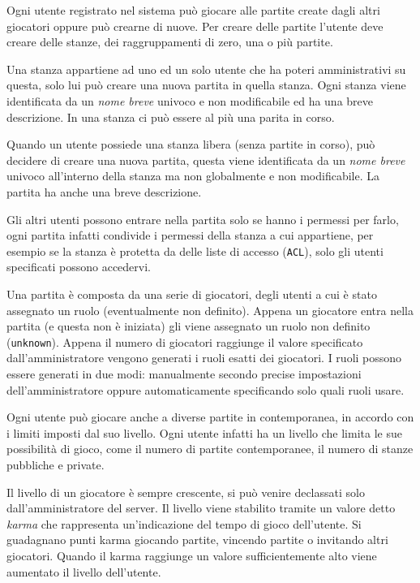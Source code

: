 Ogni utente registrato nel sistema può giocare alle partite create dagli altri giocatori oppure può crearne di nuove. Per creare delle partite l'utente deve creare delle stanze, dei raggruppamenti di zero, una o più partite.

Una stanza appartiene ad uno ed un solo utente che ha poteri amministrativi su questa, solo lui può creare una nuova partita in quella stanza. Ogni stanza viene identificata da un \emph{nome breve} univoco e non modificabile ed ha una breve descrizione. In una stanza ci può essere al più una parita in corso.

Quando un utente possiede una stanza libera (senza partite in corso), può decidere di creare una nuova partita, questa viene identificata da un \emph{nome breve} univoco all'interno della stanza ma non globalmente e non modificabile. La partita ha anche una breve descrizione.

Gli altri utenti possono entrare nella partita solo se hanno i permessi per farlo, ogni partita infatti condivide i permessi della stanza a cui appartiene, per esempio se la stanza è protetta da delle liste di accesso (\texttt{ACL}), solo gli utenti specificati possono accedervi.

Una partita è composta da una serie di giocatori, degli utenti a cui è stato assegnato un ruolo (eventualmente non definito). Appena un giocatore entra nella partita (e questa non è iniziata) gli viene assegnato un ruolo non definito (\texttt{unknown}). Appena il numero di giocatori raggiunge il valore specificato dall'amministratore vengono generati i ruoli esatti dei giocatori. I ruoli possono essere generati in due modi: manualmente secondo precise impostazioni dell'amministratore oppure automaticamente specificando solo quali ruoli usare.

Ogni utente può giocare anche a diverse partite in contemporanea, in accordo con i limiti imposti dal suo livello. Ogni utente infatti ha un livello che limita le sue possibilità di gioco, come il numero di partite contemporanee, il numero di stanze pubbliche e private.

Il livello di un giocatore è sempre crescente, si può venire declassati solo dall'amministratore del server. Il livello viene stabilito tramite un valore detto \emph{karma} che rappresenta un'indicazione del tempo di gioco dell'utente. Si guadagnano punti karma giocando partite, vincendo partite o invitando altri giocatori. Quando il karma raggiunge un valore sufficientemente alto viene aumentato il livello dell'utente. 

